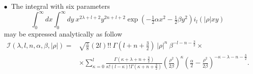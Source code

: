 $\bullet~$  The integral with six parameters  
\begin{equation}
\int_0^\infty dx \int_0^\infty dy~
x^{2\lambda+l+2} y^{2n+l+2} 
\exp\left(-\tfrac{1}{2} \alpha x^2-\tfrac{1}{2} \beta y^2 \right)
i_{l}(|\rho|xy)
\end{equation}
may be expressed analytically as follow
\begin{align}
\mathcal{I}(\lambda, l, n, \alpha, \beta, |\rho|) =& \sqrt{\frac{\pi}{8}}(2l)!!~ \Gamma(l+n+\tfrac{3}{2})~|\rho|^{n} ~\beta^{-l-n-\tfrac{3}{2}} \times \label{table_integral3} \\
& \times \sum_{\kappa=0}^{l} \frac{\Gamma(\kappa+\lambda+n+\tfrac{3}{2})}{\kappa! (l-\kappa)! \Gamma(\kappa+n+\tfrac{3}{2})}
\left(\frac{\rho^2}{2\beta}\right)^{\kappa} \left( \frac{\alpha}{2} - \frac{\rho^2}{2\beta}  \right)^{-\kappa-\lambda-n-\tfrac{3}{2}}.
 \nonumber
\end{align}